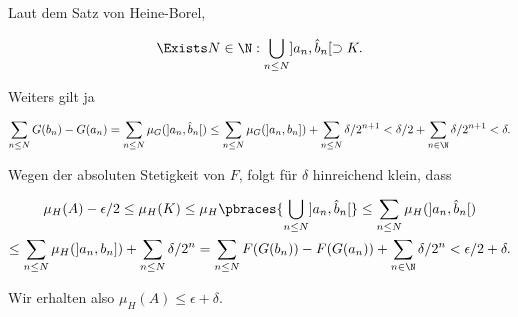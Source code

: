 \begin{solution}
Laut dem Satz von Heine-Borel,

\begin{align*}
    \Exists N \in \N:
        \bigcup_{n \leq N} ]a_n, \hat b_n[ \supset K.
\end{align*}

Weiters gilt ja

\begin{align*}
    \sum_{n \leq N}
        G(b_n) - G(a_n)
    =
    \sum_{n \leq N}
            \mu_G(]a_n, \hat b_n[)
    \leq
    \sum_{n \leq N}
        \mu_G(]a_n, b_n])
    +
    \sum_{n \leq N}
        \delta / 2^{n+1}
    <
    \delta / 2 + \sum_{n \in \N} \delta / 2^{n+1}
    <
    \delta.
\end{align*}

Wegen der absoluten Stetigkeit von $F$, folgt für $\delta$ hinreichend klein, dass

\begin{multline*}
    \mu_H(A) - \epsilon / 2
    \leq
    \mu_H(K)
    \leq
    \mu_H \pbraces{\bigcup_{n \leq N} ]a_n, \hat b_n[}
    \leq
    \sum_{n \leq N}
        \mu_H(]a_n, \hat b_n[) \\
    \leq
    \sum_{n \leq N}
        \mu_H(]a_n, b_n])
    +
    \sum_{n \leq N}
        \delta / 2^n
    =
    \sum_{n \leq N}
        F(G(b_n)) - F(G(a_n))
    +
    \sum_{n \in \N}
        \delta / 2^n
    <
    \epsilon / 2 + \delta.
\end{multline*}

Wir erhalten also $\mu_H(A) \leq \epsilon + \delta$.

\end{solution}

